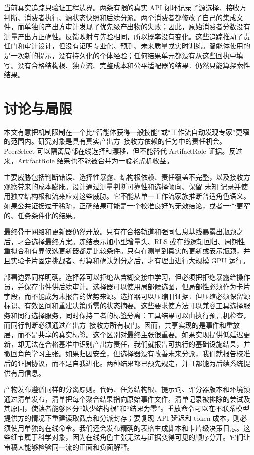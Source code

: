 \documentclass[UTF8,twocolumn]{ctexart}
\newcommand{\unknown}{\textsc{未知}}
\begin{document}
当前真实追踪只验证工程边界。两条有限的真实 API 闭环记录了源选择、接收方判断、消费者执行、源状态快照和后续分派。两个消费者都修改了自己的集成文件，而单独的产出方审计发现了优先级产出物的失败；因此，原始消费者分数没有测量产出方正确性。反馈映射与先验相同，所以概率没有变化。这些追踪推动了责任门和审计设计，但没有证明专业化、预测、未来质量或实时训练。智能体使用的是一次新的提示，没有持久化的个体经验；任何结果单元都没有从这些回执中填写。没有合格结构根、独立流、完整成本和公平适配器的结果，仍然只能算探索性结果。

\section{讨论与局限}

本文有意把机制限制在一个比“智能体获得一般技能”或“工作流自动发现专家”更窄的范围内。研究对象是具有真实产出方--接收方依赖的任务中的责任机会。PeerSelect 可以隔离局部在线选择和漂移，但不能替代 ArtifactRole 证据。反过来，ArtifactRole 结果也不能被合并为一般老虎机收益。

主要威胁包括判断错误、选择性暴露、结构根依赖、责任覆盖不完整，以及接收方观察带来的成本膨胀。设计通过测量判断可靠性和选择倾向、保留 \unknown{} 记录并使用独立结构根和流来应对这些威胁。它不能从单一工作流家族推断普适角色语义。如果公共证据过于稀疏，正确结果可能是一个校准良好的无效结论，或者一个更窄的、任务条件化的结果。

最终骨干网络和更新器仍然开放。只有在合格轨道和强同信息基线暴露出瓶颈之后，才会选择最终方案。冻结表示加小型增量头、RLS 或在线逻辑回归、周期性重拟合和有界候选更新器都是比较条件。只有在测量到真实的更新或表示瓶颈，并且实验卡片固定挑战者、预算和确认划分之后，才有理由进行大规模 GPU 运行。

部署边界同样明确。选择器可以拒绝从含糊交接中学习，但必须把拒绝暴露给操作员，并保存事件供后续审计。选择器可以使用局部候选图，但局部性必须作为卡片字段，而不能成为未报告的优势来源。选择器可以压缩旧证据，但压缩必须保留源标识、有效区间和重建决策所需的状态摘要。这些要求使方法可以兼容工具选择服务和同行选择服务，同时保持二者的标签分离：工具结果可以由执行预言机检查，而同行判断必须通过产出方--接收方所有权门。因而，共享实现的是事件和重放层，而不是共享的真实标签。这个区别对最终主张很重要。如果实现提供低延迟更新，却无法在合格基准中识别产出方责任，我们就报告可执行的基础设施结果，并撤回角色学习主张。如果归因安全，但选择器没有改善未来分派，我们就报告校准后的证据协议，而不是自我进化。两种结果都已预先规定，并且都能为后续系统提供有用信息。

产物发布遵循同样的分离原则。代码、任务结构根、提示词、评分器版本和环境锁通过清单发布，清单把每个聚合结果指向原始事件文件。清单记录被排除的尝试及其原因，使读者能够区分“缺少结构根”和“结果为零”。重放命令可以在不联系模型提供方的情况下重建读取截点和分派封存；要复现 API 延迟和 token 成本，则必须使用单独的在线命令。我们还会发布精确的表格生成脚本和卡片级决策日志。这些细节属于科学对象，因为在线角色主张无法与证据变得可见的顺序分开。它们让审稿人能够检验同一流的正面和负面解释。
\end{document}
